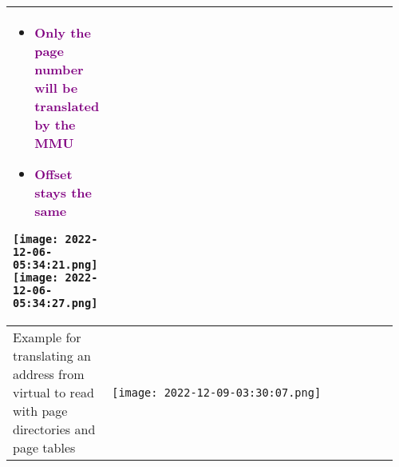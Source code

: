 \documentclass[main.tex,fontsize=8pt,paper=a4,paper=portrait,DIV=calc,]{scrartcl}
\begin{document}
\begin{table}[ht!]
\begin{tabular}{|m{0.2\linewidth}|m{0.755\linewidth}|}
\begin{itemize}
\begin{itemize}
  \end{itemize} 
\item \textcolor{purple}{Only the page number will be translated by the MMU}
\item \textcolor{purple}{Offset stays the same}
\end{itemize}
\texttt{[image: 2022-12-06-05:34:21.png]} 
\texttt{[image: 2022-12-06-05:34:27.png]}\\
\hline
Example for translating an address from virtual to read with page directories and page tables &
\vspace{2mm}
\texttt{[image: 2022-12-09-03:30:07.png]}\\
\hline

\hline

\hline
\end{tabular}
\end{table}
\pagebreak
\end{document}
